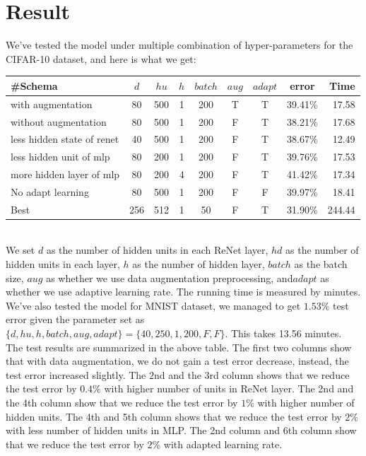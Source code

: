 \documentclass[final,leqno]{siamltex}
\begin{document}
\section{Result} \label{result}
We've tested the model under multiple combination of hyper-parameters for the CIFAR-10 dataset, and here is what we get:
\begin{center}
\end{center}
\begin{center}
\begin{tabular}{l c c c c c c c r}
\hline
\#Schema & $d$ & $hu$ & $h$ & $batch$ & $aug$ & $adapt$ & error & Time\\
\hline
with augmentation & 80 & 500 & 1 & 200 & T & T & 39.41\% & 17.58\\
without augmentation & 80 & 500 & 1 & 200 & F & T & 38.21\% & 17.68\\
less hidden state of renet & 40 & 500 & 1 & 200 & F & T & 38.67\% & 12.49\\
less hidden unit of mlp & 80 & 200 & 1 & 200 & F & T & 39.76\% & 17.53\\
more hidden layer of mlp & 80 & 200 & 4 & 200 & F & T & 41.42\% & 17.34\\
No adapt learning & 80 & 500 & 1 & 200 & F & F & 39.97\% & 18.41\\
Best & 256 & 512 &  1 & 50 & F & T & 31.90\% & 244.44\\
\hline
\end{tabular}	
\end{center} 
~\\
We set $d$ as the number of hidden units in each ReNet layer, $hd$ as the number of hidden units in each layer, $h$ as the number of hidden layer, $batch$ as the batch size, $aug$ as whether we use data augmentation preprocessing, and$adapt$ as whether we use adaptive learning rate. The running time is measured by minutes.\\

We've also tested the model for MNIST dataset, we managed to get $1.53\%$ test error given the parameter set as $\{d, hu, h, batch, aug, adapt\}=\{40, 250, 1, 200, F, F\}$. This takes 13.56 minutes.\\

The test results are summarized in the above table. The first two columns show that with data augmentation, we do not gain a test error decrease, instead, the test error increased slightly. The $2$nd and the $3$rd column shows that we reduce the test error by $0.4\%$ with higher number of units in ReNet layer. The 2nd and the 4th column show that we reduce the test error by $1\%$ with higher number of hidden units. The 4th and 5th column shows that we reduce the test error by $2\%$ with less number of hidden units in MLP. The 2nd column and 6th column show that we reduce the test error by $2\%$ with adapted learning rate.\\
\end{document}
